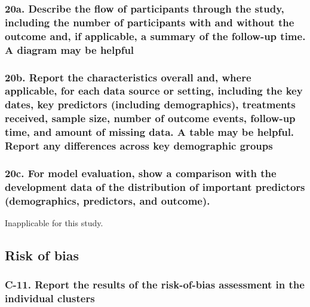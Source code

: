 \documentclass[
  letterpaper,
  DIV=11,
  numbers=noendperiod]{scrartcl}
\begin{document}
\subsubsection{20a. Describe the flow of participants through the study,
including the number of participants with and without the outcome and,
if applicable, a summary of the follow-up time. A diagram may be
helpful}\label{a.-describe-the-flow-of-participants-through-the-study-including-the-number-of-participants-with-and-without-the-outcome-and-if-applicable-a-summary-of-the-follow-up-time.-a-diagram-may-be-helpful}

\subsubsection{20b. Report the characteristics overall and, where
applicable, for each data source or setting, including the key dates,
key predictors (including demographics), treatments received, sample
size, number of outcome events, follow-up time, and amount of missing
data. A table may be helpful. Report any differences across key
demographic
groups}\label{b.-report-the-characteristics-overall-and-where-applicable-for-each-data-source-or-setting-including-the-key-dates-key-predictors-including-demographics-treatments-received-sample-size-number-of-outcome-events-follow-up-time-and-amount-of-missing-data.-a-table-may-be-helpful.-report-any-differences-across-key-demographic-groups}

\subsubsection{20c. For model evaluation, show a comparison with the
development data of the distribution of important predictors
(demographics, predictors, and
outcome).}\label{c.-for-model-evaluation-show-a-comparison-with-the-development-data-of-the-distribution-of-important-predictors-demographics-predictors-and-outcome.}

Inapplicable for this study.

\subsection{Risk of bias}\label{risk-of-bias}

\subsubsection{C-11. Report the results of the risk-of-bias assessment
in the individual
clusters}\label{c-11.-report-the-results-of-the-risk-of-bias-assessment-in-the-individual-clusters}
\end{document}
